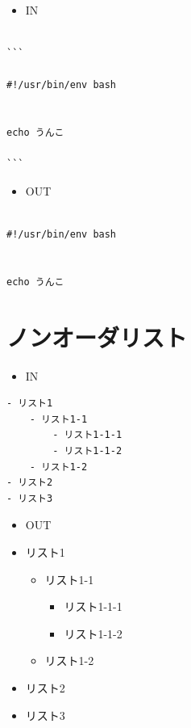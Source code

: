\documentclass[]{article}
\begin{document}
\begin{itemize}
\item
  IN
\end{itemize}

\begin{verbatim}

```

#!/usr/bin/env bash


echo うんこ

```
\end{verbatim}

\begin{itemize}
\item
  OUT
\end{itemize}

\begin{verbatim}

#!/usr/bin/env bash


echo うんこ
\end{verbatim}

\section{ノンオーダリスト}\label{header-n266}

\begin{itemize}
\item
  IN
\end{itemize}

\begin{verbatim}
- リスト1
    - リスト1-1
        - リスト1-1-1
        - リスト1-1-2
    - リスト1-2
- リスト2
- リスト3
\end{verbatim}

\begin{itemize}
\item
  OUT
\item
  リスト1

  \begin{itemize}
  \item
    リスト1-1

    \begin{itemize}
    \item
      リスト1-1-1
    \item
      リスト1-1-2
    \end{itemize}
  \item
    リスト1-2
  \end{itemize}
\item
  リスト2
\item
  リスト3
\end{itemize}
\end{document}
